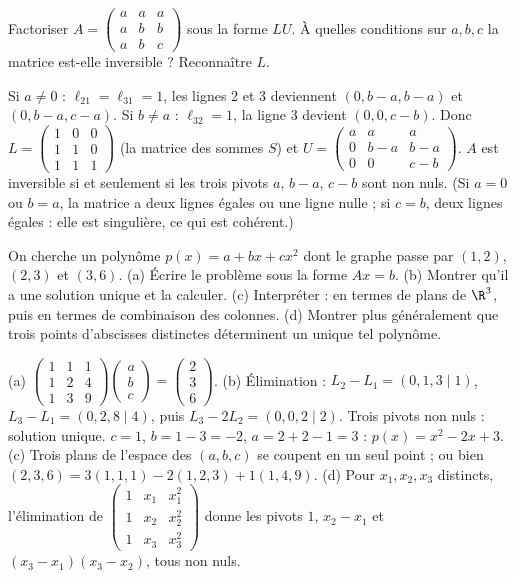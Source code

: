 \begin{exo}
Factoriser $A=\begin{pmatrix}a&a&a\\a&b&b\\a&b&c\end{pmatrix}$ sous la forme $LU$. À quelles conditions sur $a,b,c$ la matrice est-elle inversible ? Reconnaître $L$.
\begin{corrige}
Si $a\neq0$ : $\ell_{21}=\ell_{31}=1$, les lignes 2 et 3 deviennent $(0,b-a,b-a)$ et $(0,b-a,c-a)$. Si $b\neq a$ : $\ell_{32}=1$, la ligne 3 devient $(0,0,c-b)$. Donc $L=\begin{pmatrix}1&0&0\\1&1&0\\1&1&1\end{pmatrix}$ (la matrice des sommes $S$) et $U=\begin{pmatrix}a&a&a\\0&b-a&b-a\\0&0&c-b\end{pmatrix}$. $A$ est inversible si et seulement si les trois pivots $a$, $b-a$, $c-b$ sont non nuls. (Si $a=0$ ou $b=a$, la matrice a deux lignes égales ou une ligne nulle ; si $c=b$, deux lignes égales : elle est singulière, ce qui est cohérent.)
\end{corrige}
\end{exo}
\begin{exo}
On cherche un polynôme $p(x)=a+bx+cx^2$ dont le graphe passe par $(1,2)$, $(2,3)$ et $(3,6)$. (a) Écrire le problème sous la forme $Ax=b$. (b) Montrer qu'il a une solution unique et la calculer. (c) Interpréter : en termes de plans de $\R^3$, puis en termes de combinaison des colonnes. (d) Montrer plus généralement que trois points d'abscisses distinctes déterminent un unique tel polynôme.
\begin{corrige}
(a) $\begin{pmatrix}1&1&1\\1&2&4\\1&3&9\end{pmatrix}\begin{pmatrix}a\\b\\c\end{pmatrix}=\begin{pmatrix}2\\3\\6\end{pmatrix}$.
(b) Élimination : $L_2-L_1=(0,1,3\mid1)$, $L_3-L_1=(0,2,8\mid4)$, puis $L_3-2L_2=(0,0,2\mid2)$. Trois pivots non nuls : solution unique. $c=1$, $b=1-3=-2$, $a=2+2-1=3$ : $p(x)=x^2-2x+3$.
(c) Trois plans de l'espace des $(a,b,c)$ se coupent en un seul point ; ou bien $(2,3,6)=3(1,1,1)-2(1,2,3)+1(1,4,9)$.
(d) Pour $x_1,x_2,x_3$ distincts, l'élimination de $\begin{pmatrix}1&x_1&x_1^2\\1&x_2&x_2^2\\1&x_3&x_3^2\end{pmatrix}$ donne les pivots $1$, $x_2-x_1$ et $(x_3-x_1)(x_3-x_2)$, tous non nuls.
\end{corrige}
\end{exo}
